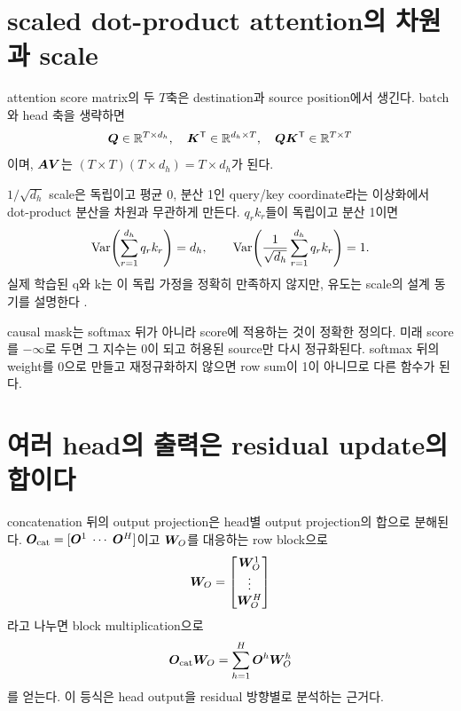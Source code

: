 \section{scaled dot-product attention의 차원과 scale}

attention score matrix의 두 $T$축은 destination과 source position에서 생긴다.
batch와 head 축을 생략하면
\begin{equation}
  \bm{Q}\in\mathbb{R}^{T\times d_h},\quad
  \bm{K}^{\mathsf T}\in\mathbb{R}^{d_h\times T},\quad
  \bm{Q}\bm{K}^{\mathsf T}\in\mathbb{R}^{T\times T}
\end{equation}
이며, $\bm{A}\bm{V}$는 $(T\times T)(T\times d_h)=T\times d_h$가 된다.

$1/\sqrt{d_h}$ scale은 독립이고 평균 0, 분산 1인 query/key coordinate라는 이상화에서 dot-product 분산을 차원과 무관하게 만든다.
$q_r k_r$들이 독립이고 분산 1이면
\begin{equation}
  \operatorname{Var}\!\left(\sum_{r=1}^{d_h}q_r k_r\right)=d_h,\qquad
  \operatorname{Var}\!\left(\frac{1}{\sqrt{d_h}}\sum_{r=1}^{d_h}q_r k_r\right)=1.
\end{equation}
실제 학습된 q와 k는 이 독립 가정을 정확히 만족하지 않지만, 유도는 scale의 설계 동기를 설명한다 \citep{vaswani2017attention}.

causal mask는 softmax 뒤가 아니라 score에 적용하는 것이 정확한 정의다.
미래 score를 $-\infty$로 두면 그 지수는 0이 되고 허용된 source만 다시 정규화된다.
softmax 뒤의 weight를 0으로 만들고 재정규화하지 않으면 row sum이 1이 아니므로 다른 함수가 된다.

\section{여러 head의 출력은 residual update의 합이다}

concatenation 뒤의 output projection은 head별 output projection의 합으로 분해된다.
$\bm{O}_{\mathrm{cat}}=[\bm{O}^{1}\;\cdots\;\bm{O}^{H}]$이고 $\bm{W}_O$를 대응하는 row block으로
\begin{equation}
  \bm{W}_O=
  \begin{bmatrix}
    \bm{W}_O^1\\ \vdots\\ \bm{W}_O^H
  \end{bmatrix}
\end{equation}
라고 나누면 block multiplication으로
\begin{equation}
  \bm{O}_{\mathrm{cat}}\bm{W}_O
  =\sum_{h=1}^{H}\bm{O}^{h}\bm{W}_O^h
\end{equation}
를 얻는다.
이 등식은 head output을 residual 방향별로 분석하는 근거다.

